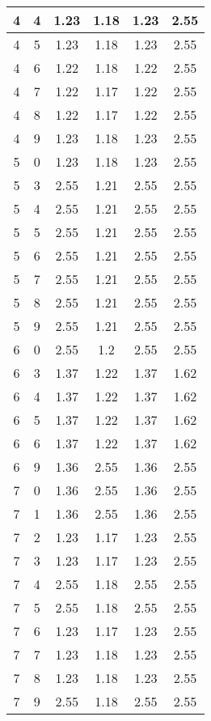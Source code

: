 \begin{longtable}{|c|c||c||c||c|c|}
	4 & 4 & 1.23 & 1.18 & 1.23 & 2.55 \\ \hline
	4 & 5 & 1.23 & 1.18 & 1.23 & 2.55 \\ \hline
	4 & 6 & 1.22 & 1.18 & 1.22 & 2.55 \\ \hline
	4 & 7 & 1.22 & 1.17 & 1.22 & 2.55 \\ \hline
	4 & 8 & 1.22 & 1.17 & 1.22 & 2.55 \\ \hline
	4 & 9 & 1.23 & 1.18 & 1.23 & 2.55 \\ \hline
	5 & 0 & 1.23 & 1.18 & 1.23 & 2.55 \\ \hline
	5 & 3 & 2.55 & 1.21 & 2.55 & 2.55 \\ \hline
	5 & 4 & 2.55 & 1.21 & 2.55 & 2.55 \\ \hline
	5 & 5 & 2.55 & 1.21 & 2.55 & 2.55 \\ \hline
	5 & 6 & 2.55 & 1.21 & 2.55 & 2.55 \\ \hline
	5 & 7 & 2.55 & 1.21 & 2.55 & 2.55 \\ \hline
	5 & 8 & 2.55 & 1.21 & 2.55 & 2.55 \\ \hline
	5 & 9 & 2.55 & 1.21 & 2.55 & 2.55 \\ \hline
	6 & 0 & 2.55 & 1.2 & 2.55 & 2.55 \\ \hline
	6 & 3 & 1.37 & 1.22 & 1.37 & 1.62 \\ \hline
	6 & 4 & 1.37 & 1.22 & 1.37 & 1.62 \\ \hline
	6 & 5 & 1.37 & 1.22 & 1.37 & 1.62 \\ \hline
	6 & 6 & 1.37 & 1.22 & 1.37 & 1.62 \\ \hline
	6 & 9 & 1.36 & 2.55 & 1.36 & 2.55 \\ \hline
	7 & 0 & 1.36 & 2.55 & 1.36 & 2.55 \\ \hline
	7 & 1 & 1.36 & 2.55 & 1.36 & 2.55 \\ \hline
	7 & 2 & 1.23 & 1.17 & 1.23 & 2.55 \\ \hline
	7 & 3 & 1.23 & 1.17 & 1.23 & 2.55 \\ \hline
	7 & 4 & 2.55 & 1.18 & 2.55 & 2.55 \\ \hline
	7 & 5 & 2.55 & 1.18 & 2.55 & 2.55 \\ \hline
	7 & 6 & 1.23 & 1.17 & 1.23 & 2.55 \\ \hline
	7 & 7 & 1.23 & 1.18 & 1.23 & 2.55 \\ \hline
	7 & 8 & 1.23 & 1.18 & 1.23 & 2.55 \\ \hline
	7 & 9 & 2.55 & 1.18 & 2.55 & 2.55 \\ \hline
\end{longtable}

